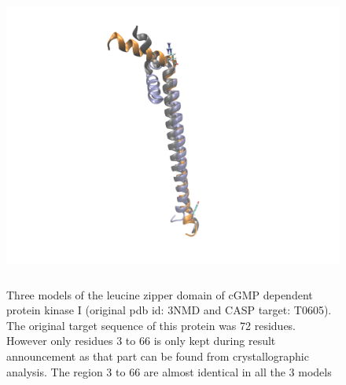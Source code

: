 \documentclass[12pt]{article}
\begin{document}
\begin{figure}
\begin{center}
\includegraphics[width=12cm,height=10cm]{T0605.pdf}
\end{center}
\caption{ Three models of the leucine zipper domain of cGMP dependent protein
kinase I (original pdb id: 3NMD and CASP target: T0605). The original target sequence of this protein was 72 residues.
However only residues 3 to 66 is only kept during result announcement as that part can be found from crystallographic analysis. The
region 3 to 66 are almost identical in all the 3 models  }
\label{fig:T0605}
\end{figure}
\end{document}
